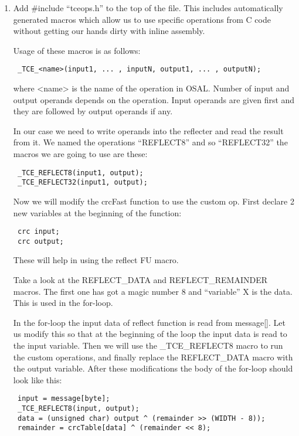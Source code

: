 \documentclass[twoside]{tceusermanual}
\begin{document}
\begin{enumerate}
\item%
Add \#include ``tceops.h'' to the top of the file. This includes 
automatically generated macros which allow us to use specific 
operations from C code without getting our hands dirty with
inline assembly.

Usage of these macros is as follows:

\begin{verbatim}
 _TCE_<name>(input1, ... , inputN, output1, ... , outputN);
\end{verbatim}

where <name> is the name of the operation in OSAL. Number of input and output
operands depends on the operation. Input operands are given first and they are
followed by output operands if any. 

In our case we need to write operands into the reflecter and read the
result from it. We named the operations ``REFLECT8'' and so ``REFLECT32'' the
macros we are going to use are these:

\begin{verbatim}
 _TCE_REFLECT8(input1, output);
 _TCE_REFLECT32(input1, output);
\end{verbatim}

Now we will modify the crcFast function to use the custom op.
First declare 2 new variables at the beginning of the function:

\begin{verbatim}
 crc input;
 crc output;
\end{verbatim}

These will help in using the reflect FU macro.

Take a look at the REFLECT\_DATA and REFLECT\_REMAINDER macros. The first one
has got a magic number 8 and ``variable'' X is the data. This is used in the
for-loop.

In the for-loop the input data of reflect function is read from message[].
Let us modify this so that at the beginning of the loop the input data is
read to the input variable. Then we will use the \_TCE\_REFLECT8 macro to run
the custom operations, and finally replace the REFLECT\_DATA macro with the
output variable. After these modifications the body of the for-loop should
look like this:

\begin{verbatim}
 input = message[byte];
 _TCE_REFLECT8(input, output);
 data = (unsigned char) output ^ (remainder >> (WIDTH - 8));
 remainder = crcTable[data] ^ (remainder << 8);
\end{verbatim}


\end{enumerate}
\end{document}
